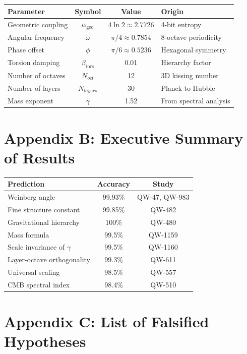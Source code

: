 \documentclass[11pt, a4paper]{article}
\theoremstyle{remark}
\newcommand{\alphageo}{\alpha_{\text{geo}}}
\newcommand{\betators}{\beta_{\text{tors}}}
\begin{document}
\begin{center}
\begin{tabular}{|l|c|c|l|}
\hline
\textbf{Parameter} & \textbf{Symbol} & \textbf{Value} & \textbf{Origin} \\
\hline
Geometric coupling & $\alphageo$ & $4\ln 2 \approx 2.7726$ & 4-bit entropy \\
Angular frequency & $\omega$ & $\pi/4 \approx 0.7854$ & 8-octave periodicity \\
Phase offset & $\phi$ & $\pi/6 \approx 0.5236$ & Hexagonal symmetry \\
Torsion damping & $\betators$ & 0.01 & Hierarchy factor \\
Number of octaves & $N_{oct}$ & 12 & 3D kissing number \\
Number of layers & $N_{layers}$ & 30 & Planck to Hubble \\
Mass exponent & $\gamma$ & 1.52 & From spectral analysis \\
\hline
\end{tabular}
\end{center}

\section{Appendix B: Executive Summary of Results}

\begin{center}
\begin{tabular}{|l|c|c|}
\hline
\textbf{Prediction} & \textbf{Accuracy} & \textbf{Study} \\
\hline
Weinberg angle & 99.93\% & QW-47, QW-983 \\
Fine structure constant & 99.85\% & QW-482 \\
Gravitational hierarchy & 100\% & QW-480 \\
Mass formula & 99.5\% & QW-1159 \\
Scale invariance of $\gamma$ & 99.5\% & QW-1160 \\
Layer-octave orthogonality & 99.3\% & QW-611 \\
Universal scaling & 98.5\% & QW-557 \\
CMB spectral index & 98.4\% & QW-510 \\
\hline
\end{tabular}
\end{center}

\section{Appendix C: List of Falsified Hypotheses}
\end{document}
